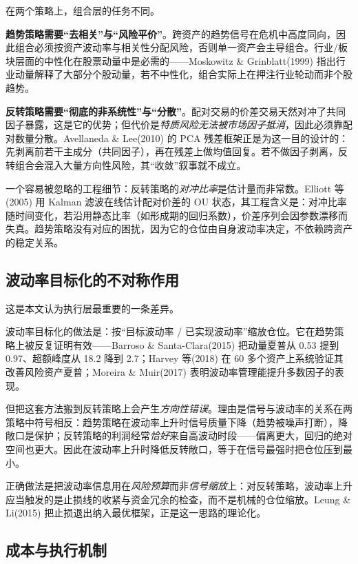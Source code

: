 在两个策略上，组合层的任务不同。

\textbf{趋势策略需要“去相关”与“风险平价”}。跨资产的趋势信号在危机中高度同向，因此组合必须按资产波动率与相关性分配风险，否则单一资产会主导组合。行业/板块层面的中性化在股票动量中是必需的——Moskowitz \& Grinblatt(1999) 指出行业动量解释了大部分个股动量\cite{moskowitzgrinblatt1999}，若不中性化，组合实际上在押注行业轮动而非个股趋势。

\textbf{反转策略需要“彻底的非系统性”与“分散”}。配对交易的价差交易天然对冲了共同因子暴露，这是它的优势；但代价是\emph{特质风险无法被市场因子抵消}，因此必须靠配对数量分散。Avellaneda \& Lee(2010) 的 PCA 残差框架正是为这一目的设计的：先剥离前若干主成分（共同因子），再在残差上做均值回复\cite{avellaneda2010}。若不做因子剥离，反转组合会混入大量方向性风险，其“收敛”叙事就不成立。

一个容易被忽略的工程细节：反转策略的\emph{对冲比率}是估计量而非常数。Elliott 等(2005) 用 Kalman 滤波在线估计配对价差的 OU 状态\cite{elliott2005}，其工程含义是：对冲比率随时间变化，若沿用静态比率（如形成期的回归系数），价差序列会因参数漂移而失真。趋势策略没有对应的困扰，因为它的仓位由自身波动率决定，不依赖跨资产的稳定关系。

\subsection{波动率目标化的不对称作用}

这是本文认为执行层最重要的一条差异。

波动率目标化的做法是：按“目标波动率 / 已实现波动率”缩放仓位。它在趋势策略上被反复证明有效——Barroso \& Santa-Clara(2015) 把动量夏普从 0.53 提到 0.97、超额峰度从 18.2 降到 2.7\cite{barroso2015}；Harvey 等(2018) 在 60 多个资产上系统验证其改善风险资产夏普\cite{harvey2018}；Moreira \& Muir(2017) 表明波动率管理能提升多数因子的表现\cite{moreiramuir2017}。

但把这套方法搬到反转策略上会产生\emph{方向性错误}。理由是信号与波动率的关系在两策略中符号相反：趋势策略在波动率上升时信号质量下降（趋势被噪声打断），降敞口是保护；反转策略的利润经常\emph{恰好}来自高波动时段——偏离更大，回归的绝对空间也更大。因此在波动率上升时降低反转敞口，等于在信号最强时把仓位压到最小。

正确做法是把波动率信息用在\emph{风险预算}而非\emph{信号缩放}上：对反转策略，波动率上升应当触发的是止损线的收紧与资金冗余的检查，而不是机械的仓位缩放。Leung \& Li(2015) 把止损退出纳入最优框架，正是这一思路的理论化\cite{leungli2015}。

\subsection{成本与执行机制}

